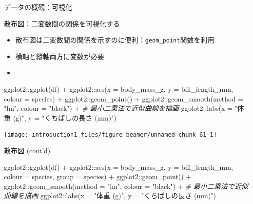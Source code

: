 \documentclass[
  ignorenonframetext,
]{beamer}
\newenvironment{Shaded}{\begin{snugshade}}{\end{snugshade}}
\newcommand{\AttributeTok}[1]{\textcolor[rgb]{0.77,0.63,0.00}{#1}}
\newcommand{\CommentTok}[1]{\textcolor[rgb]{0.56,0.35,0.01}{\textit{#1}}}
\newcommand{\FunctionTok}[1]{\textcolor[rgb]{0.00,0.00,0.00}{#1}}
\newcommand{\NormalTok}[1]{#1}
\newcommand{\SpecialCharTok}[1]{\textcolor[rgb]{0.00,0.00,0.00}{#1}}
\newcommand{\StringTok}[1]{\textcolor[rgb]{0.31,0.60,0.02}{#1}}
\providecommand{\tightlist}{%
  \setlength{\itemsep}{0pt}\setlength{\parskip}{0pt}}
\begin{document}
\begin{frame}[fragile]{データの概観：可視化}
\begin{block}{散布図：二変数間の関係を可視化する}
\protect\hypertarget{ux6563ux5e03ux56f3ux4e8cux5909ux6570ux9593ux306eux95a2ux4fc2ux3092ux53efux8996ux5316ux3059ux308b}{}
\begin{itemize}
\tightlist
\item
  散布図は二変数間の関係を示すのに便利：\texttt{geom\_point}関数を利用
\item
  横軸と縦軸両方に変数が必要
\item
\end{itemize}

\begin{Shaded}
\begin{Highlighting}[]
\NormalTok{ggplot2}\SpecialCharTok{::}\FunctionTok{ggplot}\NormalTok{(df) }\SpecialCharTok{+}
\NormalTok{  ggplot2}\SpecialCharTok{::}\FunctionTok{aes}\NormalTok{(}\AttributeTok{x =}\NormalTok{ body\_mass\_g, }\AttributeTok{y =}\NormalTok{ bill\_length\_mm, }\AttributeTok{colour =}\NormalTok{ species) }\SpecialCharTok{+}
\NormalTok{  ggplot2}\SpecialCharTok{::}\FunctionTok{geom\_point}\NormalTok{() }\SpecialCharTok{+}
\NormalTok{  ggplot2}\SpecialCharTok{::}\FunctionTok{geom\_smooth}\NormalTok{(}\AttributeTok{method =} \StringTok{"lm"}\NormalTok{, }\AttributeTok{colour =} \StringTok{"black"}\NormalTok{) }\SpecialCharTok{+} \CommentTok{\# 最小二乗法で近似曲線を描画}
\NormalTok{  ggplot2}\SpecialCharTok{::}\FunctionTok{labs}\NormalTok{(}\AttributeTok{x =} \StringTok{"体重 (g)"}\NormalTok{, }\AttributeTok{y =} \StringTok{"くちばしの長さ (mm)"}\NormalTok{)}
\end{Highlighting}
\end{Shaded}

\begin{center}\texttt{[image: introduction1\_files/figure-beamer/unnamed-chunk-61-1]} \end{center}
\end{block}

\begin{block}{散布図 (cont'd)}
\protect\hypertarget{ux6563ux5e03ux56f3-contd}{}
\begin{Shaded}
\begin{Highlighting}[]
\NormalTok{ggplot2}\SpecialCharTok{::}\FunctionTok{ggplot}\NormalTok{(df) }\SpecialCharTok{+}
\NormalTok{  ggplot2}\SpecialCharTok{::}\FunctionTok{aes}\NormalTok{(}\AttributeTok{x =}\NormalTok{ body\_mass\_g, }\AttributeTok{y =}\NormalTok{ bill\_length\_mm, }\AttributeTok{colour =}\NormalTok{ species, }\AttributeTok{group =}\NormalTok{ species) }\SpecialCharTok{+}
\NormalTok{  ggplot2}\SpecialCharTok{::}\FunctionTok{geom\_point}\NormalTok{() }\SpecialCharTok{+}
\NormalTok{  ggplot2}\SpecialCharTok{::}\FunctionTok{geom\_smooth}\NormalTok{(}\AttributeTok{method =} \StringTok{"lm"}\NormalTok{, }\AttributeTok{colour =} \StringTok{"black"}\NormalTok{) }\SpecialCharTok{+} \CommentTok{\# 最小二乗法で近似曲線を描画}
\NormalTok{  ggplot2}\SpecialCharTok{::}\FunctionTok{labs}\NormalTok{(}\AttributeTok{x =} \StringTok{"体重 (g)"}\NormalTok{, }\AttributeTok{y =} \StringTok{"くちばしの長さ (mm)"}\NormalTok{)}
\end{Highlighting}
\end{Shaded}


\end{block}
\end{frame}
\end{document}
